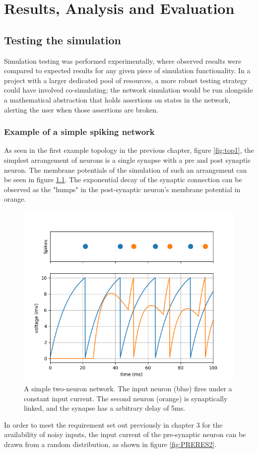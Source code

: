 \chapter{Results, Analysis and Evaluation}

\section{Testing the simulation}

Simulation testing was performed experimentally, where observed results were
compared to expected results for any given piece of simulation functionality. In
a project with a larger dedicated pool of resources, 
a more robust testing strategy could have involved co-simulating; the
network simulation would be run alongside a mathematical abstraction that holds
assertions on states in the network, alerting the user when those assertions
are broken.

\subsection{Example of a simple spiking network}

As seen in the first example topology in the previous chapter, figure
\ref{fig:top1}, the simplest arrangement of neurons is a single synapse with a
pre and post synaptic neuron. The membrane potentials of the simulation of such
an arrangement can be seen in figure \ref{fig:PRERES1}. The exponential decay of
the synaptic connection can be observed as the "humps" in the post-synaptic
neuron's membrane potential in orange.

\begin{figure}[h!]
    \centering
    \includegraphics[width=0.7\linewidth]{figures/graphs/DelayBugFixed.png}
    \caption[A simple two-neuron network]{A simple two-neuron network. The input neuron (blue) fires under a constant input current. The second neuron (orange) is synaptically linked, and the synapse has a arbitrary delay of 5ms.}
    \label{fig:PRERES1}
\end{figure}
\FloatBarrier
In order to meet the requirement set out previously in chapter 3 for the
availability of noisy inputs, the input current of the pre-synaptic neuron can
be drawn from a random distribution, as shown in figure \ref{fig:PRERES2}. 

